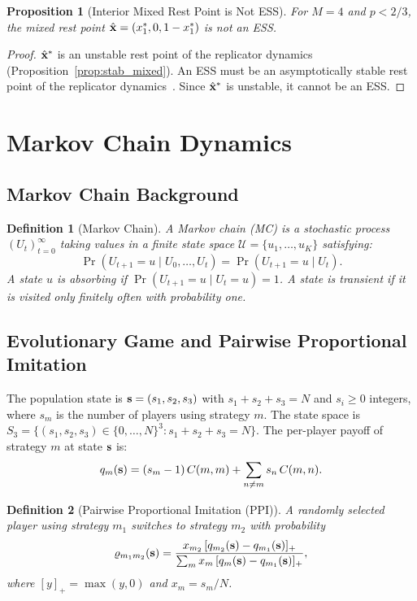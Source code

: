 \documentclass[12pt,a4paper]{article}
\newtheorem{definition}{Definition}[section]
\newtheorem{proposition}{Proposition}[section]
\begin{document}
\begin{proposition}[Interior Mixed Rest Point is Not ESS]
For $M=4$ and $p<2/3$, the mixed rest point
$\hat{\bf x}=(x_1^*,0,1-x_1^*)$ is not an ESS.
\end{proposition}

\begin{proof}
$\hat{\bf x}^*$ is an unstable rest point of the replicator dynamics
(Proposition~\ref{prop:stab_mixed}). An ESS must be an asymptotically stable
rest point of the replicator dynamics~\cite{LK2026,Hofbauer1998}. Since
$\hat{\bf x}^*$ is unstable, it cannot be an ESS.
\end{proof}

\section{Markov Chain Dynamics}
\label{sec:markov}

\subsection{Markov Chain Background}

\begin{definition}[Markov Chain]\label{def:MC}
A \emph{Markov chain} (MC) is a stochastic process $(U_t)_{t=0}^\infty$ taking
values in a finite state space $\mathcal{U}=\{u_1,\ldots,u_K\}$ satisfying:
\[
  \Pr(U_{t+1}=u\mid U_0,\ldots,U_t) = \Pr(U_{t+1}=u\mid U_t).
\]
A state $u$ is \emph{absorbing} if $\Pr(U_{t+1}=u\mid U_t=u)=1$. A state is
\emph{transient} if it is visited only finitely often with probability one.
\end{definition}

\subsection{Evolutionary Game and Pairwise Proportional Imitation}

The population state is ${\bf s}=(s_1,s_2,s_3)$ with $s_1+s_2+s_3=N$ and
$s_i\geq 0$ integers, where $s_m$ is the number of players using strategy $m$.
The state space is
$S_3=\{(s_1,s_2,s_3)\in\{0,\ldots,N\}^3 : s_1+s_2+s_3=N\}$.
The per-player payoff of strategy $m$ at state ${\bf s}$ is:
\[
  q_m({\bf s}) = (s_m-1)\,C(m,m) + \sum_{n\neq m} s_n\,C(m,n).
\]

\begin{definition}[Pairwise Proportional Imitation (PPI)]
\label{def:PPI}
A randomly selected player using strategy $m_1$ switches to strategy $m_2$
with probability
\[
  \varrho_{m_1 m_2}({\bf s}) =
  \frac{x_{m_2}\,[q_{m_2}({\bf s})-q_{m_1}({\bf s})]_+}
       {\sum_m x_m\,[q_m({\bf s})-q_{m_1}({\bf s})]_+},
\]
where $[y]_+=\max(y,0)$ and $x_m=s_m/N$.
\end{definition}
\end{document}
